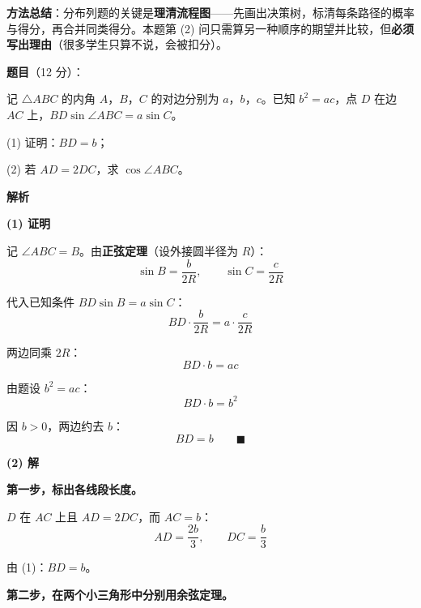 \begin{answer}
\begin{gktip}
\textbf{方法总结}：分布列题的关键是\textbf{理清流程图}——先画出决策树，标清每条路径的概率与得分，再合并同类得分。本题第 (2) 问只需算另一种顺序的期望并比较，但\textbf{必须写出理由}（很多学生只算不说，会被扣分）。
\end{gktip}



\par\medskip

\end{answer}
\begin{answer}

\textbf{题目}（12 分）：

记 $\triangle ABC$ 的内角 $A$，$B$，$C$ 的对边分别为 $a$，$b$，$c$。已知 $b^{2}=ac$，点 $D$ 在边 $AC$ 上，$BD\sin\angle ABC=a\sin C$。

  (1) 证明：$BD=b$；

  (2) 若 $AD=2DC$，求 $\cos\angle ABC$。

\textbf{解析}

\par\medskip

\textbf{(1) 证明}

记 $\angle ABC=B$。由\textbf{正弦定理}（设外接圆半径为 $R$）：
\nopagebreak[4]
\[\sin B=\frac b{2R},\qquad \sin C=\frac c{2R}\]

代入已知条件 $BD\sin B=a\sin C$：
\nopagebreak[4]
\[BD\cdot\frac b{2R}=a\cdot\frac c{2R}\]

两边同乘 $2R$：
\nopagebreak[4]
\[BD\cdot b=ac\]

由题设 $b^{2}=ac$：
\nopagebreak[4]
\[BD\cdot b=b^{2}\]

因 $b>0$，两边约去 $b$：
\nopagebreak[4]
\[BD=b\qquad\blacksquare\]

\par\medskip

\textbf{(2) 解}

\textbf{第一步，标出各线段长度。}

$D$ 在 $AC$ 上且 $AD=2DC$，而 $AC=b$：
\nopagebreak[4]
\[AD=\frac{2b}3,\qquad DC=\frac b3\]

由 (1)：$BD=b$。

\textbf{第二步，在两个小三角形中分别用余弦定理。}


\end{answer}
